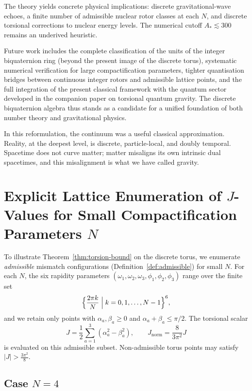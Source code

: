 \documentclass[a4paper]{article}
\theoremstyle{definition}
\theoremstyle{remark}
\newcommand{\Jnorm}{J_{\mathrm{norm}}}
\newcommand{\Jbound}{\frac{3\pi^2}{8}}
\begin{document}
The theory yields concrete physical implications: discrete gravitational-wave echoes, a finite number of admissible nuclear rotor classes at each \(N\), and discrete torsional corrections to nuclear energy levels. The numerical cutoff \(A_* \lesssim 300\) remains an underived heuristic.

Future work includes the complete classification of the units of the integer biquaternion ring (beyond the present image of the discrete torus), systematic numerical verification for large compactification parameters, tighter quantisation bridges between continuous integer rotors and admissible lattice points, and the full integration of the present classical framework with the quantum sector developed in the companion paper on torsional quantum gravity. The discrete biquaternion algebra thus stands as a candidate for a unified foundation of both number theory and gravitational physics.

In this reformulation, the continuum was a useful classical approximation. Reality, at the deepest level, is discrete, particle-local, and doubly temporal. Spacetime does not curve matter; matter misaligns its own intrinsic dual spacetimes, and this misalignment is what we have called gravity.

\appendix

\section{Explicit Lattice Enumeration of \texorpdfstring{\( J \)-Values}{J-Values} for Small Compactification Parameters \texorpdfstring{\( N \)}{N}}

To illustrate Theorem~\ref{thm:torsion-bound} on the discrete torus, we enumerate \emph{admissible} mismatch configurations (Definition~\ref{def:admissible}) for small \( N \). For each \( N \), the six rapidity parameters \( (\omega_1,\omega_2,\omega_3,\phi_1,\phi_2,\phi_3) \) range over the finite set
\[
\Bigl\{ \frac{2\pi k}{N} \Bigm| k = 0,1,\dots,N-1 \Bigr\}^6,
\]
and we retain only points with \(\alpha_a,\beta_a \geq 0\) and \(\alpha_a + \beta_a \leq \pi/2\). The torsional scalar
\[
J = \frac12 \sum_{a=1}^3 (\alpha_a^2 - \beta_a^2), \qquad
\Jnorm = \frac{8}{3\pi^2} J
\]
is evaluated on this admissible subset. Non-admissible torus points may satisfy \(|J| > \Jbound\).

\subsection{Case \texorpdfstring{$N = 4$}{N = 4}}
\end{document}
